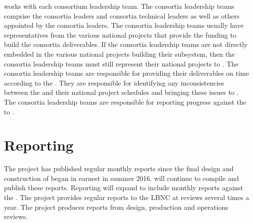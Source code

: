   works with each consortium leadership team. The
consortia leadership teams comprise the consortia leaders and 
consortia technical leaders as well as others appointed by the consortia
leaders. The consortia leadership teams usually have representatives
from the various national projects that provide the funding to build the consortia
deliverables. If the consortia leadership teams are not directly
embedded in the various national projects building their subsystem,
then the consortia leadership teams must still represent their national projects
to . The consortia leadership teams are responsible for
providing their deliverables on time according to the
. They are responsible for identifying any inconsistencies
between the  and their national project schedules and
bringing these issues to . The consortia leadership teams
are responsible for reporting progress against the  to
.

\section{Reporting}
\label{sec:fdsp-coord-reporting}

The  project has published regular monthly reports since
the final design and construction of  began in
earnest in summer 2016.  will continue to compile and publish these
reports. Reporting will expand to include monthly reports against the
. The  project provides regular reports to the
LBNC at reviews several times a year. The  project
produces reports from design, production and operations reviews.





%
